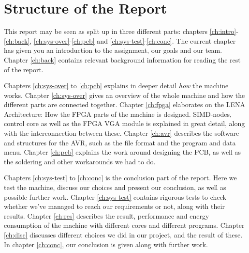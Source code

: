 \section{Structure of the Report}

This report may be seen as split up in three different parts: chapters
\ref{ch:intro}-\ref{ch:back}, \ref{ch:sys-over}-\ref{ch:pcb} and
\ref{ch:sys-test}-\ref{ch:conc}.  The
current chapter has given you an introduction to the assignment, our goals and
our team. Chapter \ref{ch:back} contains relevant background information for
reading the rest of the report.

Chapters \ref{ch:sys-over} to \ref{ch:pcb} explains in deeper detail {\em how}
the machine works. Chapter \ref{ch:sys-over} gives an
overview of the whole machine and how the different parts are connected
together. Chapter \ref{ch:fpga} elaborates on the LENA Architecture: How the
FPGA parts of the machine is designed. SIMD-nodes, control core as well as the
FPGA VGA module is explained in great detail, along with the interconnection
between these. Chapter \ref{ch:avr} describes the software and structures for
the AVR, such as the file format and the program and data menu. Chapter
\ref{ch:pcb} explains the work around designing the PCB, as well as the
soldering and other workarounds we had to do.

Chapters \ref{ch:sys-test} to \ref{ch:conc} is the conclusion part of the
report. Here we test the machine, discuss our choices and present our
conclusion, as well as possible further work. Chapter \ref{ch:sys-test} contains
rigorous tests to check whether we've managed to reach our requirements or not,
along with their results. Chapter \ref{ch:res} describes the result, performance
and energy consumption of the machine with different cores and different
programs. Chapter \ref{ch:disc} discusses different choices we did in our
project, and the result of these. In chapter \ref{ch:conc}, our conclusion is
given along with further work.

